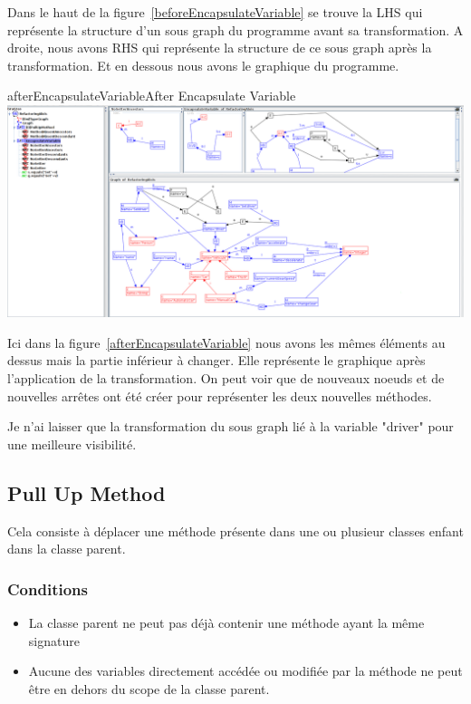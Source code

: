 \documentclass[a4paper, 12pt]{article}
\begin{document}
\begin{enumerate}
Dans le haut de la figure~\ref{beforeEncapsulateVariable} se trouve la LHS qui représente la structure d'un sous graph du programme avant sa transformation. A droite, nous avons RHS qui représente la structure de ce sous graph après la transformation. Et en dessous nous avons le graphique du programme.

\begin{myfig}{afterEncapsulateVariable}{After Encapsulate Variable}
\includegraphics[width=\textwidth]{afterEncapsulateVariable.png}
\end{myfig}

Ici dans la figure~\ref{afterEncapsulateVariable} nous avons les mêmes éléments au dessus mais la partie inférieur à changer. 
Elle représente le graphique après l'application de la transformation. On peut voir que de nouveaux noeuds et de nouvelles arrêtes ont été créer pour représenter les deux nouvelles méthodes.

Je n'ai laisser que la transformation du sous graph lié à la variable "driver" pour une meilleure visibilité.

\subsection{Pull Up Method}

Cela consiste à déplacer une méthode présente dans une ou plusieur classes enfant dans la classe parent. 

\subsubsection{Conditions}

\begin{itemize}[label=\textbullet]
\item La classe parent ne peut pas déjà contenir une méthode ayant la même signature
\item Aucune des variables directement accédée ou modifiée par la méthode ne peut être en dehors du scope de la classe parent.
\end{itemize}


\end{enumerate}
\end{document}
